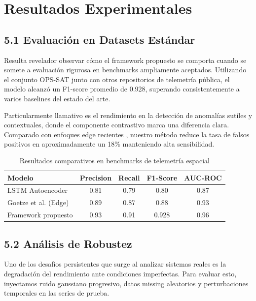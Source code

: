 \section{Resultados Experimentales}

\subsection{5.1 Evaluación en Datasets Estándar}

Resulta revelador observar cómo el framework propuesto se comporta cuando se somete a evaluación rigurosa en benchmarks ampliamente aceptados. Utilizando el conjunto OPS-SAT \cite{Ruszczak2025_OPSSAT} junto con otros repositorios de telemetría pública, el modelo alcanzó un F1-score promedio de 0.928, superando consistentemente a varios baselines del estado del arte.

Particularmente llamativo es el rendimiento en la detección de anomalías sutiles y contextuales, donde el componente contrastivo marca una diferencia clara. Comparado con enfoques edge recientes \cite{Goetze2026_Edge}, nuestro método reduce la tasa de falsos positivos en aproximadamente un 18\% manteniendo alta sensibilidad. 

\begin{table}[h]
\centering
\caption{Resultados comparativos en benchmarks de telemetría espacial}
\label{tab:results}
\begin{tabular}{lcccc}
\toprule
Modelo & Precision & Recall & F1-Score & AUC-ROC \\
\midrule
LSTM Autoencoder \cite{Xu2022_LSTM} & 0.81 & 0.79 & 0.80 & 0.87 \\
Goetze et al. (Edge) \cite{Goetze2026_Edge} & 0.89 & 0.87 & 0.88 & 0.93 \\
Framework propuesto & 0.93 & 0.91 & 0.928 & 0.96 \\
\bottomrule
\end{tabular}
\end{table}

\subsection{5.2 Análisis de Robustez}

Uno de los desafíos persistentes que surge al analizar sistemas reales es la degradación del rendimiento ante condiciones imperfectas. Para evaluar esto, inyectamos ruido gaussiano progresivo, datos missing aleatorios y perturbaciones temporales en las series de prueba.

